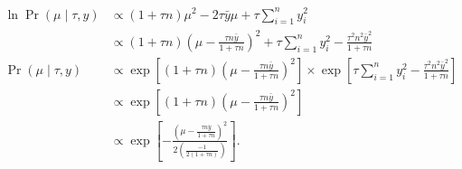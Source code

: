 \documentclass[letterpaper]{article}
\begin{document}
\begin{align}
    \ln
    \Pr(\mu\mid\tau, y)
    &\propto
    \left(1+\tau n\right) \mu^2
    -2\tau\bar{y}\mu
    + \tau \sum_{i=1}^n y_i^2
    \\
    &\propto
    \left(1+\tau n\right)
    \left(\mu - \frac{\tau n\bar{y}}{1+\tau n}\right)^2
    + \tau \sum_{i=1}^n y_i^2
    -\frac{\tau^2 n^2\bar{y}^2}{1+\tau n}
    \\
    \Pr(\mu\mid\tau, y)
    &\propto
    \exp\left[
    \left(1+\tau n\right)
    \left(\mu - \frac{\tau n\bar{y}}{1+\tau n}\right)^2
    \right]
    \times
    \exp\left[
    \tau \sum_{i=1}^n y_i^2
    -\frac{\tau^2 n^2\bar{y}^2}{1+\tau n}
    \right]
    \\
    &\propto
    \exp\left[
    \left(1+\tau n\right)
    \left(\mu - \frac{\tau n\bar{y}}{1+\tau n}\right)^2
    \right]
    \\
    &\propto
    \exp\left[
    -\frac{
    \left(\mu - \frac{\tau n\bar{y}}{1+\tau n}\right)^2
    }{  
    2\left(\frac{-1}{2\left(1+\tau n\right)}\right)
    }
    \right].
\end{align}
\end{document}
